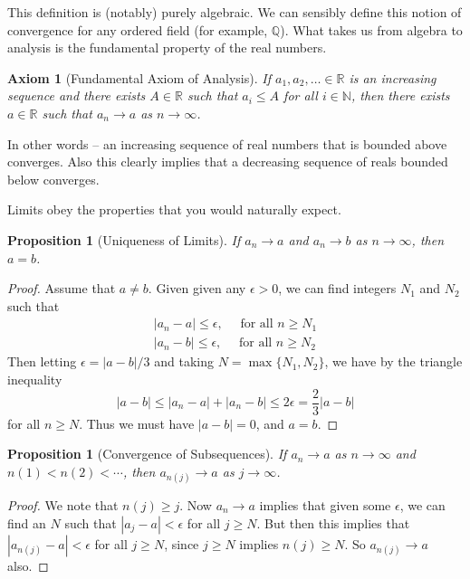 \documentclass[11pt, a4paper]{article}
\newtheorem{proposition}[theorem]{Proposition}
\newtheorem{axiomthm}[theorem]{Axiom}
\theoremstyle{definition}
\newcommand{\N}{\mathbb{N}}
\newcommand{\Q}{\mathbb{Q}}
\newcommand{\R}{\mathbb{R}}
\begin{document}
This definition is (notably) purely algebraic. We can sensibly define this notion of convergence for any ordered field (for example, $\Q$). What takes us from algebra to analysis is the fundamental property of the real numbers.

\begin{axiomthm}[Fundamental Axiom of Analysis]
If $a_1, a_2, \dots \in \R$ is an increasing sequence and there exists $A \in \R$ such that $a_i \leq A$ for all $i \in \N$, then there exists $a \in \R$ such that $a_n \rightarrow a$ as $n \rightarrow \infty$.
\end{axiomthm}

In other words -- an increasing sequence of real numbers that is bounded above converges. Also this clearly implies that a decreasing sequence of reals bounded below converges.

Limits obey the properties that you would naturally expect.
 
\begin{proposition}[Uniqueness of Limits]
	If $a_n \rightarrow a$ and $a_n \rightarrow b$ as $n \rightarrow \infty$, then $a = b$.
\end{proposition}
\begin{proof}
	Assume that $a \neq b$. Given given any $\epsilon > 0$, we can find integers $N_1$ and $N_2$ such that
	\begin{align*}
		|a_n - a| \leq \epsilon, \quad \text{ for all $n \geq N_1$}\\
		|a_n - b| \leq \epsilon, \quad \text{ for all $n \geq N_2$}
	\end{align*}
	Then letting $\epsilon = |a - b|/3$ and taking $N = \max\{N_1, N_2\}$, we have by the triangle inequality
	$$
	|a - b| \leq |a_n - a| + |a_n - b| \leq 2\epsilon = \frac{2}{3} |a - b|
	$$
	for all $n \geq N$.
	Thus we must have $|a - b| = 0$, and $a = b$.
\end{proof}

\begin{proposition}[Convergence of Subsequences]
	If $a_n \rightarrow a$ as $n \rightarrow \infty$ and $n(1) < n(2) < \cdots$, then $a_{n(j)} \rightarrow a$ as $j \rightarrow \infty$.
\end{proposition}
\begin{proof}
	We note that $n(j) \geq j$. Now $a_n \rightarrow a$ implies that given some $\epsilon$, we can find an $N$ such that $|a_j - a| < \epsilon$ for all $j \geq N$. But then this implies that $|a_{n(j)} - a| < \epsilon$ for all $j \geq N$, since $j \geq N$ implies $n(j) \geq N$. So $a_{n(j)} \rightarrow a$ also.
\end{proof}
\end{document}
